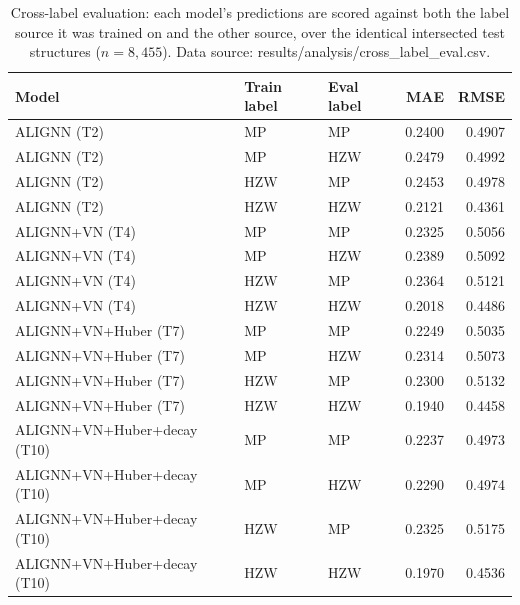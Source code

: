 \documentclass[a4paper,10pt]{article}
\begin{document}
\begin{table}[htbp]
\centering
\caption{Cross-label evaluation: each model's predictions are scored against both the label source it was trained on and the other source, over the identical intersected test structures (\(n=8{,}455\)). Data source: \textnormal{results/analysis/cross\_label\_eval.csv}.}
\label{tab:cross-label}
\small
\begin{tabular}{l l l r r}
\toprule
Model & Train label & Eval label & MAE & RMSE \\
\midrule
ALIGNN (T2)                & MP  & MP  & 0.2400 & 0.4907 \\
ALIGNN (T2)                & MP  & HZW & 0.2479 & 0.4992 \\
ALIGNN (T2)                & HZW & MP  & 0.2453 & 0.4978 \\
ALIGNN (T2)                & HZW & HZW & 0.2121 & 0.4361 \\
\midrule
ALIGNN+VN (T4)             & MP  & MP  & 0.2325 & 0.5056 \\
ALIGNN+VN (T4)             & MP  & HZW & 0.2389 & 0.5092 \\
ALIGNN+VN (T4)             & HZW & MP  & 0.2364 & 0.5121 \\
ALIGNN+VN (T4)             & HZW & HZW & 0.2018 & 0.4486 \\
\midrule
ALIGNN+VN+Huber (T7)       & MP  & MP  & 0.2249 & 0.5035 \\
ALIGNN+VN+Huber (T7)       & MP  & HZW & 0.2314 & 0.5073 \\
ALIGNN+VN+Huber (T7)       & HZW & MP  & 0.2300 & 0.5132 \\
ALIGNN+VN+Huber (T7)       & HZW & HZW & 0.1940 & 0.4458 \\
\midrule
ALIGNN+VN+Huber+decay (T10) & MP  & MP  & 0.2237 & 0.4973 \\
ALIGNN+VN+Huber+decay (T10) & MP  & HZW & 0.2290 & 0.4974 \\
ALIGNN+VN+Huber+decay (T10) & HZW & MP  & 0.2325 & 0.5175 \\
ALIGNN+VN+Huber+decay (T10) & HZW & HZW & 0.1970 & 0.4536 \\
\bottomrule
\end{tabular}
\end{table}
\end{document}
